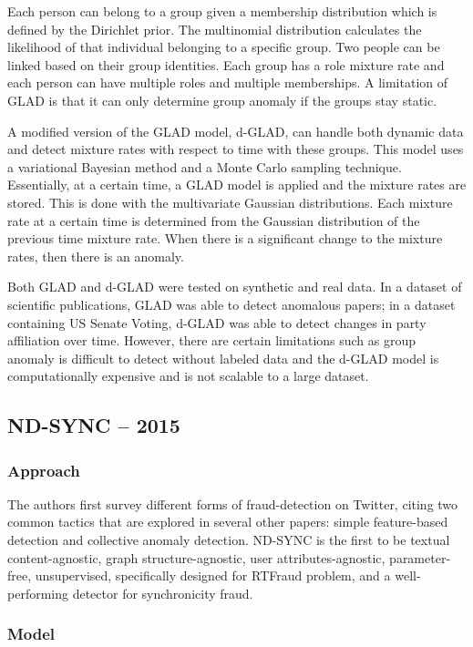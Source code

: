 \documentclass[11pt, oneside]{article}   	%
\begin{document}
\quad Each person can belong to a group given a membership distribution which is defined by the Dirichlet prior.
The multinomial distribution calculates the likelihood of that individual belonging to a specific group.
Two people can be linked based on their group identities.
Each group has a role mixture rate and each person can have multiple roles and multiple memberships.
A limitation of GLAD is that it can only determine group anomaly if the groups stay static.

\quad A modified version of the GLAD model, d-GLAD, can handle both dynamic data and detect mixture rates with respect to time with these groups.
This model uses a variational Bayesian method and a Monte Carlo sampling technique.
Essentially, at a certain time, a GLAD model is applied and the mixture rates are stored.
This is done with the multivariate Gaussian distributions.
Each mixture rate at a certain time is determined from the Gaussian distribution of the previous time mixture rate.
When there is a significant change to the mixture rates, then there is an anomaly.

\quad Both GLAD and d-GLAD were tested on synthetic and real data.
In a dataset of scientific publications, GLAD was able to detect anomalous papers; in a dataset containing US Senate Voting, d-GLAD was able to detect changes in party affiliation over time.
However, there are certain limitations such as group anomaly is difficult to detect without labeled data and the d-GLAD model is computationally expensive and is not scalable to a large dataset.

\subsection*{ND-SYNC -- 2015}

\subsubsection*{Approach}

\quad The authors first survey different forms of fraud-detection on Twitter, citing two common tactics that are explored in several other papers: simple feature-based detection and collective anomaly detection.
ND-SYNC is the first to be textual content-agnostic, graph structure-agnostic, user attributes-agnostic, parameter-free, unsupervised, specifically designed for RTFraud problem, and a well-performing detector for synchronicity fraud.

\subsubsection*{Model}
\end{document}
